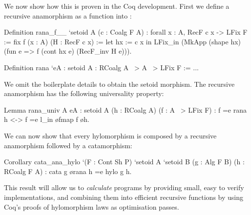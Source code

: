 \documentclass[anonymous, a4paper, UKenglish, cleveref, autoref, thm-restate]{lipics-v2021}
\begin{document}
We now show how this is proven in the Coq development. First we define a
recursive anamorphism as a function into :
\begin{coqcode}
Definition rana_f__ `{setoid A} (c : Coalg F A)
  : forall x : A, RecF c x -> LFix F
  := fix f (x : A) (H : RecF c x) :=
       let hx := c x in
       LFix_in (MkApp (shape hx) (fun e => f (cont hx e) (RecF_inv H e))).

Definition rana `{eA : setoid A} : RCoalg A ~> A ~> LFix F := ...
\end{coqcode}
We omit the boilerplate details to obtain the setoid morphism.
The recursive anamorphism has the following universality property:
\begin{coqcode}
Lemma rana_univ A {eA : setoid A} (h : RCoalg A) (f : A ~> LFix F)
    : f =e rana h <-> f =e l_in \o fmap f \o h.
\end{coqcode}
We can now show that every hylomorphism is composed by a recursive anamorphism
followed by a catamorphism:
\begin{coqcode}
Corollary cata_ana_hylo `(F : Cont Sh P) `{setoid A} `{setoid B}
  (g : Alg F B) (h : RCoalg F A)
: cata g \o rana h =e hylo g h.
\end{coqcode}
This result will allow us to \emph{calculate} programs by providing small, easy
to verify implementations, and combining them into efficient recursive functions
by using Coq's proofs of hylomorphism laws as optimisation passes.
\end{document}
